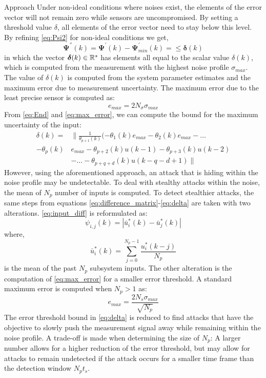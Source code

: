 \begin{section}{Approach}
Under non-ideal conditions where noises exist, the elements of the error vector will not remain zero while sensors are uncompromised. By setting a threshold value $\delta$, all elements of the error vector need to stay below this level. By refining \eqref{eq:Psi2} for non-ideal conditions we get,
    \begin{equation}
    \label{eq:Psi2_nonideal}
	\bm{\Psi^{''}}(k)=\bm{\Psi^{'}}(k)-\bm{\Psi}^{'}_{min}(k)= \leq \bm{\delta}(k)
	\end{equation}
in which the vector $\bm{\delta}(k) \in \mathbb{R}^s$ has elements all equal to the scalar value $\delta(k)$, which is computed from the measurement with the highest noise profile $\sigma_{max}$. The value of $\delta(k)$ is computed from the system parameter estimates and the maximum error due to measurement uncertainty. The maximum error due to the least precise sensor is computed as:
	\begin{equation}
	    \label{eq:max_error}
	    e_{max} = 2N_{\sigma}\sigma_{max}
	\end{equation}
From \eqref{eq:End} and \eqref{eq:max_error}, we can compute the bound for the maximum uncertainty of the input:
\begin{align}
	\label{eq:delta}
	\delta(k)=& \lVert{ \frac{1}{\theta_{p+1}(k)}(-\theta_1(k)e_{max}-\theta_2(k)e_{max} }-\dots \nonumber \\
    -\theta_p(k)&e_{max}-\theta_{p+2}(k)u(k-1)-\theta_{p+3}(k)u(k-2)  \\
	&- \dots - \theta_{p+q+d}(k)u(k-q-d+1) \rVert  \nonumber
	\end{align}
However, using the aforementioned approach, an attack that is hiding within the noise profile may be undetectable. To deal with stealthy attacks within the noise, the mean of $N_p$ number of inputs is computed. To detect stealthier attacks, the same steps from equations \eqref{eq:difference_matrix}-\eqref{eq:delta} are taken with two alterations. \eqref{eq:input_diff} is reformulated as:
    \begin{equation}
        \label{eq:input_diff2}
        \psi_{i,j}(k)=|\bar{u}^*_i(k)-\bar{u}^*_j(k)|
    \end{equation}
where,
    \begin{equation}
        \label{eq:Average_input}
        \bar{u}^*_i(k) = \sum_{j=0}^{N_p-1} \frac{u^*_i(k-j)}{N_p}
    \end{equation}
is the mean of the past $N_p$ subsystem inputs. The other alteration is the computation of \eqref{eq:max_error} for a smaller error threshold. A standard maximum error is computed when $N_p>1$ as:
    \begin{equation}
	    \label{eq:max_error2}
	    e_{max} = \frac{2N_s\sigma_{max}}{\sqrt{N_p}}
	\end{equation}
The error threshold bound in \eqref{eq:delta} is reduced to find attacks that have the objective to slowly push the measurement signal away while remaining within the noise profile. A trade-off is made when determining the size of $N_p$: A larger number allows for a higher reduction of the error threshold, but may allow for attacks to remain undetected if the attack occurs for a smaller time frame than the detection window $N_pt_s$.


\end{section}
